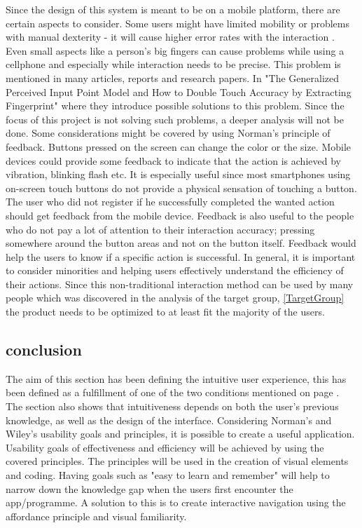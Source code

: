 Since the design of this system is meant to be on a mobile platform, there are certain aspects to consider. Some users might have limited mobility or problems with manual dexterity - it will cause higher error rates with the interaction \cite{Wileys}. Even small aspects like a person's big fingers can cause problems while using a cellphone and especially while interaction needs to be precise. This problem is mentioned in many articles, reports and research papers. In "The Generalized Perceived Input Point Model and How to Double Touch Accuracy by Extracting Fingerprint" \cite{Fatfinger} where they introduce possible solutions to this problem. Since the focus of this project is not solving such problems, a deeper analysis will not be done. Some considerations might be covered by using Norman's principle of feedback.\cite{Normans} Buttons pressed on the screen can change the color or the size. Mobile devices could provide some feedback to indicate that the action is achieved by vibration, blinking flash etc. It is especially useful since most smartphones using on-screen touch buttons do not provide a physical sensation of touching a button. The user who did not register if he successfully completed the wanted action should get feedback from the mobile device. Feedback is also useful to the people who do not pay a lot of attention to their interaction accuracy; pressing somewhere around the button areas and not on the button itself. Feedback would help the users to know if a specific action is successful. 
In general, it is important to consider minorities and helping users effectively understand the efficiency of their actions. Since this non-traditional interaction method can be used by many people which was discovered in the analysis of the target group, \ref{TargetGroup} the product needs to be optimized to at least fit the majority of the users. 

\subsection{conclusion}
The aim of this section has been defining the intuitive user experience, this has been defined as a fulfillment of one of the two conditions mentioned on page \pageref{intuitiveConditions}. The section also shows that intuitiveness depends on both the user's previous knowledge, as well as the design of the interface. Considering Norman's and Wiley's usability goals and principles, it is 
possible to create a useful application. Usability goals of effectiveness and 
efficiency will be achieved by using the covered principles. The principles will be 
used in the creation of visual elements and coding. Having goals such as "easy to learn and 
remember" will help to narrow down the knowledge gap when the users first encounter the app/programme. A solution to this is to create interactive navigation using the
affordance principle and visual familiarity.\label{EvalConUsability}

